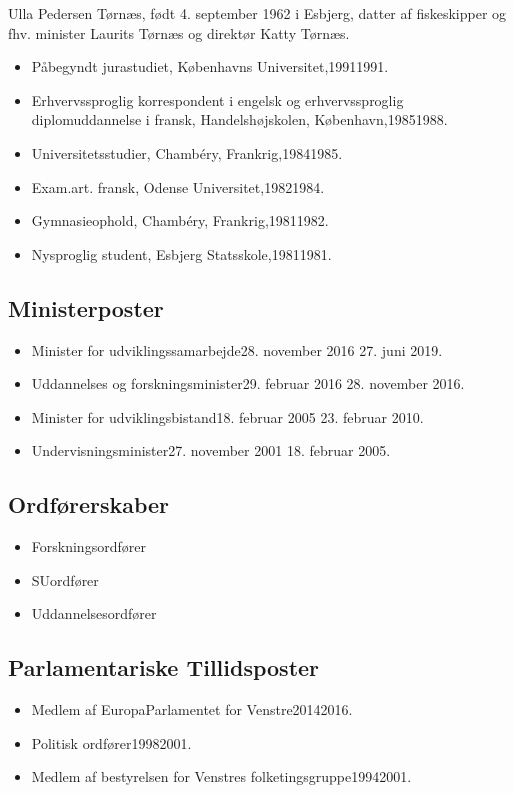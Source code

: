 \documentclass[11pt, a4paper]{awesome-cv}
\begin{document}
\makecvheader[R]
\makelettertitle
\begin{cvletter}
Ulla Pedersen Tørnæs, født 4. september 1962 i Esbjerg, datter af fiskeskipper og fhv. minister Laurits Tørnæs og direktør Katty Tørnæs.

\begin{itemize}
\item Påbegyndt jurastudiet, Københavns Universitet,19911991.
\item Erhvervssproglig korrespondent i engelsk og erhvervssproglig diplomuddannelse i fransk, Handelshøjskolen, København,19851988.
\item Universitetsstudier, Chambéry, Frankrig,19841985.
\item Exam.art. fransk, Odense Universitet,19821984.
\item Gymnasieophold, Chambéry, Frankrig,19811982.
\item Nysproglig student, Esbjerg Statsskole,19811981.
\end{itemize}
\subsection*{Ministerposter}
\begin{itemize}
\item Minister for udviklingssamarbejde28. november 2016  27. juni 2019.
\item Uddannelses og forskningsminister29. februar 2016  28. november 2016.
\item Minister for udviklingsbistand18. februar 2005  23. februar 2010.
\item Undervisningsminister27. november 2001  18. februar 2005.
\end{itemize}
\subsection*{Ordførerskaber}
\begin{itemize}
\item Forskningsordfører
\item SUordfører
\item Uddannelsesordfører
\end{itemize}
\subsection*{Parlamentariske Tillidsposter}
\begin{itemize}
\item Medlem af EuropaParlamentet for Venstre20142016.
\item Politisk ordfører19982001.
\item Medlem af bestyrelsen for Venstres folketingsgruppe19942001.
\end{itemize}

\end{cvletter}
\end{document}
